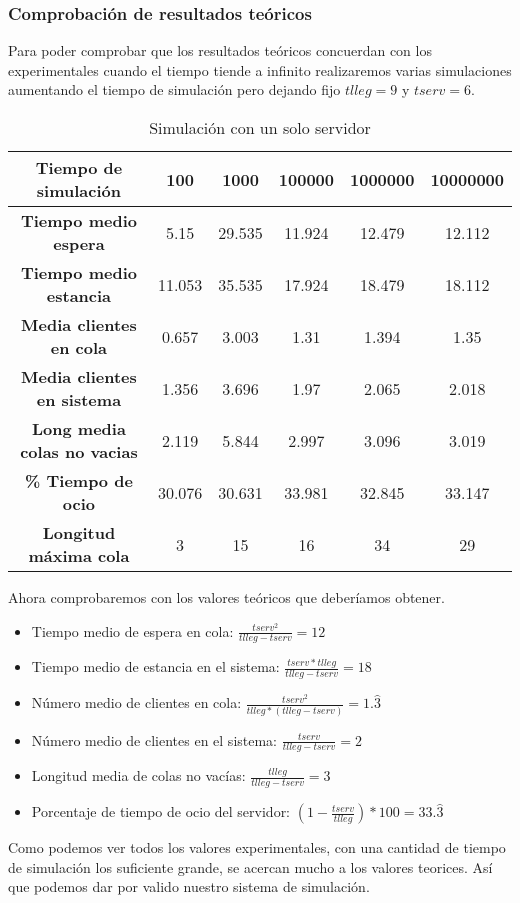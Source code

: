 \documentclass[12pt,a4paper]{article}
\begin{document}
\subsubsection{Comprobación de resultados teóricos}
Para poder comprobar que los resultados teóricos concuerdan con los experimentales cuando el tiempo tiende a infinito realizaremos varias simulaciones aumentando el tiempo de simulación pero dejando fijo $tlleg=9$ y $tserv=6$.
 \begin{table}[H]
 	\centering	
 	\begin{tabular}{c|ccccc} \toprule
 		Tiempo de simulación&100 & 1000 & 100000 & 1000000 & 10000000 \\ \midrule
 		\textbf{Tiempo medio espera}   		& 5.15  & 29.535 &  11.924 & 12.479 & 12.112 \\
 		\textbf{Tiempo medio estancia} 		& 11.053  & 35.535 & 17.924 &  18.479 & 18.112 \\
 		\textbf{Media clientes en cola}		& 0.657 & 3.003 & 1.31 & 1.394 & 1.35 \\		\midrule
 		\textbf{Media clientes en sistema} 	& 1.356 & 3.696 & 1.97 & 2.065 & 2.018 \\
 		\textbf{Long media colas no vacias} & 2.119 & 5.844 & 2.997 & 3.096 & 3.019 \\
 		\textbf{\% Tiempo de ocio}  		& 30.076 & 30.631 & 33.981 & 32.845  & 33.147 \\		
 		\textbf{Longitud máxima cola}  		& 3 & 15 & 16 & 34  & 29 \\
 		\midrule		
 	\end{tabular}
 	\caption{Simulación con un solo servidor} \label{tab:colmmk1}
 \end{table}
Ahora comprobaremos con los valores teóricos que deberíamos obtener.
\begin{itemize}
	\item Tiempo medio de espera en cola: $\frac{tserv^2}{tlleg-tserv}=12$
	\item Tiempo medio de estancia en el sistema: $\frac{tserv*tlleg}{tlleg-tserv}=18$
	\item Número medio de clientes en cola: $\frac{tserv^2}{tlleg*(tlleg-tserv)}=1.\widehat{3}$
	\item Número medio de clientes en el sistema: $\frac{tserv}{tlleg-tserv}=2$
	\item Longitud media de colas no vacías: $\frac{tlleg}{tlleg-tserv}=3$
	\item Porcentaje de tiempo de ocio del servidor: $(1-\frac{tserv}{tlleg})*100=33.\widehat{3}$
\end{itemize}
Como podemos ver todos los valores experimentales, con una cantidad de tiempo de simulación los suficiente grande, se acercan mucho a los valores teorices. Así que podemos dar por valido nuestro sistema de simulación. 
\end{document}
